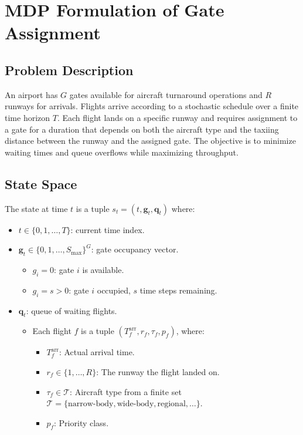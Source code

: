 \chapter{MDP Formulation of Gate Assignment}
\label{chap:mdp}

\section{Problem Description}

An airport has $G$ gates available for aircraft turnaround operations and $R$ runways for arrivals.
Flights arrive according to a stochastic schedule over a finite time horizon $T$. Each flight lands on a specific runway and requires assignment to a gate for a duration that depends on both the aircraft type and the taxiing distance between the runway and the assigned gate.
The objective is to minimize waiting times and queue overflows while maximizing throughput.

\section{State Space}

The state at time $t$ is a tuple $s_t = (t, \mathbf{g}_t, \mathbf{q}_t)$ where:

\begin{itemize}
	\item $t \in \{0, 1, \ldots, T\}$: current time index.
	\item $\mathbf{g}_t \in \{0, 1, \ldots, S_{\max}\}^G$: gate occupancy vector.
	\begin{itemize}
		\item $g_i = 0$: gate $i$ is available.
		\item $g_i = s > 0$: gate $i$ occupied, $s$ time steps remaining.
	\end{itemize}
	\item $\mathbf{q}_t$: queue of waiting flights.
	\begin{itemize}
		\item Each flight $f$ is a tuple $(T_f^{\text{arr}}, r_f, \tau_f, p_f)$, where:
		\begin{itemize}
			\item $T_f^{\text{arr}}$: Actual arrival time.
			\item $r_f \in \{1, \ldots, R\}$: The runway the flight landed on.
			\item $\tau_f \in \mathcal{T}$: Aircraft type from a finite set 
			$\mathcal{T} = \{\text{narrow-body}, \text{wide-body}, 
			\text{regional}, \ldots\}$.
			\item $p_f$: Priority class.
		\end{itemize}
	\end{itemize}
\end{itemize}

